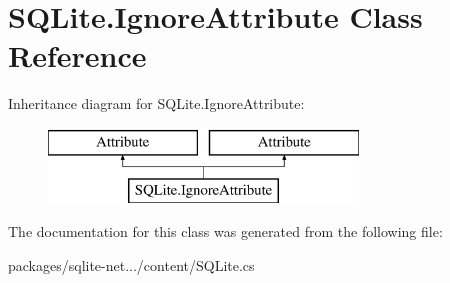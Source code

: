 \hypertarget{classSQLite_1_1IgnoreAttribute}{\section{S\-Q\-Lite.\-Ignore\-Attribute Class Reference}
\label{classSQLite_1_1IgnoreAttribute}
}
Inheritance diagram for S\-Q\-Lite.\-Ignore\-Attribute\-:\begin{figure}[H]
\begin{center}
\leavevmode
\includegraphics[height=2.000000cm]{classSQLite_1_1IgnoreAttribute}
\end{center}
\end{figure}


The documentation for this class was generated from the following file\-:\begin{DoxyCompactItemize}
\item 
packages/sqlite-\/net.../content/S\-Q\-Lite.\-cs\end{DoxyCompactItemize}
